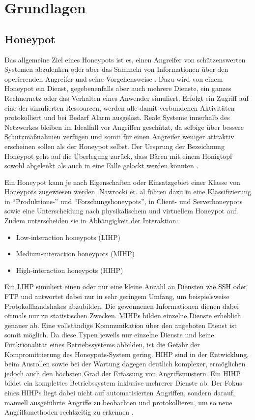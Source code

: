\chapter{Grundlagen}
\label{ch:Grundlagen}


\section{Honeypot}
\label{sec:Honeypot}

Das allgemeine Ziel eines Honeypots ist es, einen Angreifer von schützenswerten Systemen abzulenken oder aber das Sammeln von Informationen über den operierenden Angreifer und seine Vorgehensweise \cite{NawrockiWSKS16}. Dazu wird von einem Honeypot ein Dienst, gegebenenfalls aber auch mehrere Dienste, ein ganzes Rechnernetz oder das Verhalten eines Anwender simuliert. Erfolgt ein Zugriff auf eine der simulierten Ressourcen, werden alle damit verbundenen Aktivitäten protokolliert und bei Bedarf Alarm ausgelöst. Reale Systeme innerhalb des Netzwerkes bleiben im Idealfall vor Angriffen geschützt, da selbige über bessere Schutzmaßnahmen verfügen und somit für einen Angreifer weniger attraktiv erscheinen sollen als der Honeypot selbst. Der Ursprung der Bezeichnung Honeypot geht auf die Überlegung zurück, dass Bären mit einem Honigtopf sowohl abgelenkt als auch in eine Falle gelockt werden könnten \cite{WikiHoney16}.


Ein Honeypot kann je nach Eigenschaften oder Einsatzgebiet einer Klasse von Honeypots zugewiesen werden. Nawrocki et. al führen dazu in \cite{NawrockiWSKS16} eine Klassifizierung in "`Produktions-"' und "`Forschungshoneypots"', in Client- und Serverhoneypots sowie eine Unterscheidung nach physikalischem und virtuellem Honeypot auf. Zudem unterscheiden sie in Abhängigkeit der Interaktion:

\begin{itemize}
\item Low-interaction honeypots (LIHP)
\item Medium-interaction honeypots (MIHP)
\item High-interaction honeypots (HIHP)
\end{itemize}

Ein LIHP simuliert einen oder nur eine kleine Anzahl an Diensten wie SSH oder FTP und antwortet dabei nur in sehr geringem Umfang, um beispielsweise Protokollhandshakes abzubilden. Die gewonnenen Informationen dienen dabei oftmals nur zu statistischen Zwecken.
MIHPs bilden einzelne Dienste erheblich genauer ab. Eine vollständige Kommunikation über den angeboten Dienst ist somit möglich. Da diese Typen jeweils nur einzelne Dienste und keine Funktionalität eines Betriebssystems abbilden, ist die Gefahr der Kompromittierung des Honeypots-System gering. HIHP sind in der Entwicklung, beim Ausrollen sowie bei der Wartung dagegen deutlich komplexer, ermöglichen jedoch auch den höchsten Grad der Erfassung von Angriffsmustern. Ein HIHP bildet ein komplettes Betriebssystem inklusive mehrerer Dienste ab. Der Fokus eines HIHPs liegt dabei nicht auf automatisierten Angriffen, sondern darauf, manuell ausgeführte Angriffe zu beobachten und protokollieren, um so neue Angriffsmethoden rechtzeitig zu erkennen \cite{WikiHoney16}.


